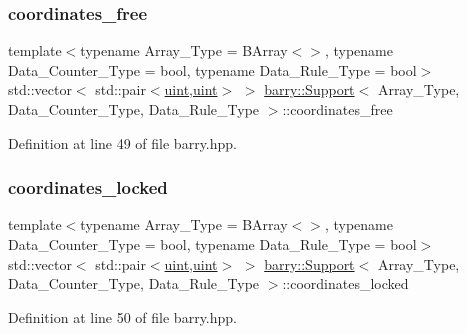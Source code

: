\subsubsection{\texorpdfstring{coordinates\+\_\+free}{coordinates\_free}}
{\footnotesize\ttfamily template$<$typename Array\+\_\+\+Type  = B\+Array$<$$>$, typename Data\+\_\+\+Counter\+\_\+\+Type  = bool, typename Data\+\_\+\+Rule\+\_\+\+Type  = bool$>$ \\
std\+::vector$<$ std\+::pair$<$\hyperlink{namespacebarry_a11dfc53ddb4672278319aa04f1e09a6c}{uint},\hyperlink{namespacebarry_a11dfc53ddb4672278319aa04f1e09a6c}{uint}$>$ $>$ \hyperlink{classbarry_1_1_support}{barry\+::\+Support}$<$ Array\+\_\+\+Type, Data\+\_\+\+Counter\+\_\+\+Type, Data\+\_\+\+Rule\+\_\+\+Type $>$\+::coordinates\+\_\+free}



Definition at line 49 of file barry.\+hpp.

\mbox{\label{classbarry_1_1_support_a3abcd564b19c7399b596a5b63c72b149}} 
\subsubsection{\texorpdfstring{coordinates\+\_\+locked}{coordinates\_locked}}
{\footnotesize\ttfamily template$<$typename Array\+\_\+\+Type  = B\+Array$<$$>$, typename Data\+\_\+\+Counter\+\_\+\+Type  = bool, typename Data\+\_\+\+Rule\+\_\+\+Type  = bool$>$ \\
std\+::vector$<$ std\+::pair$<$\hyperlink{namespacebarry_a11dfc53ddb4672278319aa04f1e09a6c}{uint},\hyperlink{namespacebarry_a11dfc53ddb4672278319aa04f1e09a6c}{uint}$>$ $>$ \hyperlink{classbarry_1_1_support}{barry\+::\+Support}$<$ Array\+\_\+\+Type, Data\+\_\+\+Counter\+\_\+\+Type, Data\+\_\+\+Rule\+\_\+\+Type $>$\+::coordinates\+\_\+locked}



Definition at line 50 of file barry.\+hpp.

\mbox{\label{classbarry_1_1_support_a5de08029a7262ba86df728c8b8427999}} 
